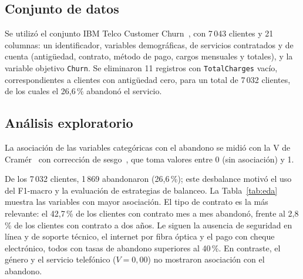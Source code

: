 \documentclass[conference]{IEEEtran}
\begin{document}
\subsection{Conjunto de datos}

Se utilizó el conjunto IBM Telco Customer Churn~\cite{ibmtelco}, con 7\,043 clientes y 21 columnas: un identificador, variables demográficas, de servicios contratados y de cuenta (antigüedad, contrato, método de pago, cargos mensuales y totales), y la variable objetivo \texttt{Churn}. Se eliminaron 11 registros con \texttt{TotalCharges} vacío, correspondientes a clientes con antigüedad cero, para un total de 7\,032 clientes, de los cuales el 26,6\,\% abandonó el servicio.

\subsection{Análisis exploratorio}

La asociación de las variables categóricas con el abandono se midió con la V de Cramér~\cite{cramer1946mathematical} con corrección de sesgo~\cite{bergsma2013bias}, que toma valores entre 0 (sin asociación) y 1.

De los 7\,032 clientes, 1\,869 abandonaron (26,6\,\%); este desbalance motivó el uso del F1-macro y la evaluación de estrategias de balanceo. La Tabla~\ref{tab:eda} muestra las variables con mayor asociación. El tipo de contrato es la más relevante: el 42,7\,\% de los clientes con contrato mes a mes abandonó, frente al 2,8\,\% de los clientes con contrato a dos años. Le siguen la ausencia de seguridad en línea y de soporte técnico, el internet por fibra óptica y el pago con cheque electrónico, todos con tasas de abandono superiores al 40\,\%. En contraste, el género y el servicio telefónico ($V=0{,}00$) no mostraron asociación con el abandono.
\end{document}
